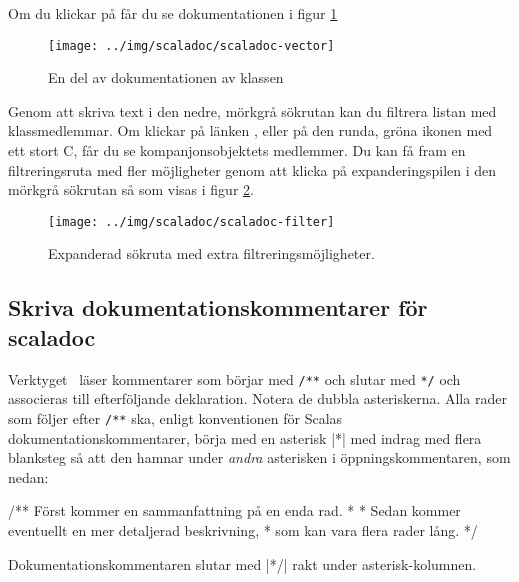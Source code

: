 Om du klickar på  får du se dokumentationen i figur  \ref{fig:scaladoc:vector}

\begin{figure}[H]
\centering
\texttt{[image: ../img/scaladoc/scaladoc-vector]}

     \caption{En del av dokumentationen av klassen }
    \label{fig:scaladoc:vector}
\end{figure}

Genom att skriva text i den nedre, mörkgrå sökrutan kan du filtrera listan med klassmedlemmar. Om klickar på länken , eller på den runda, gröna ikonen med ett stort C, får du se kompanjonsobjektets medlemmer.
Du kan få fram en filtreringsruta med fler möjligheter genom att klicka på expanderingspilen i den mörkgrå sökrutan så som visas i figur \ref{fig:scaladoc:filter}.



\begin{figure}[H]
\centering
\texttt{[image: ../img/scaladoc/scaladoc-filter]}

     \caption{Expanderad sökruta med extra filtreringsmöjligheter.}
    \label{fig:scaladoc:filter}
\end{figure}


\clearpage

\subsection{Skriva dokumentationskommentarer för scaladoc}


Verktyget \scaladoc\ läser kommentarer som börjar med \verb|/**| och slutar med \verb|*/| och associeras till efterföljande deklaration. Notera de dubbla asteriskerna. Alla rader som följer efter \verb|/**| ska, enligt konventionen för Scalas dokumentationskommentarer, börja med en asterisk \code|*| med indrag med flera blanksteg så att den hamnar under \textit{andra} asterisken i öppningskommentaren, som nedan:
\begin{Code}
/** Först kommer en sammanfattning på en enda rad.
  *
  * Sedan kommer eventuellt en mer detaljerad beskrivning,
  * som kan vara flera rader lång.
  */
\end{Code}
Dokumentationskommentaren slutar med \code|*/| rakt under asterisk-kolumnen.

